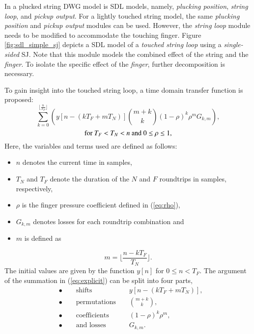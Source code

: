 \documentclass{sigchi}
\begin{document}
In \cite{karjalainen_plucked-string_1998} a plucked string DWG model is SDL models, namely, \textit{plucking position}, \textit{string loop}, and \textit{pickup output}.
For a lightly touched string model, the same \textit{plucking position} and \textit{pickup output} modules can be used.
However, the \textit{string loop} module needs to be modified to accommodate the touching finger.
Figure \ref{fig:sdl_simple_sj} depicts a SDL model of a \textit{touched string loop} using a \textit{single-sided} SJ.
Note that this module models the combined effect of the string and the \textit{finger}.
To isolate the specific effect of the \textit{finger}, further decomposition is necessary.
\begin{figure*}[h]
	\centering
	\scalebox{0.8}{}
	\caption{String loop with a scattering junction.}
	\label{fig:sdl_simple_sj}
\end{figure*}
To gain insight into the touched string loop, a time domain transfer function is proposed:
\begin{equation} \label{eq:explicit}
	\sum_{k=0}^{\lfloor \frac{n}{T_F} \rfloor}\left(y[n - (kT_F + mT_N)]\binom{m+k}{k} (1 - \rho)^{k} \rho^mG_{k,m}\right),
\end{equation}
\begin{equation*}
	\textrm{for } T_F<T_N<n \textrm{ and } 0\leq\rho\leq1\notag,
\end{equation*}
Here, the variables and terms used are defined as follows:
\begin{itemize}
	\setlength\itemsep{0.1em}
	\item $n$ denotes the current time in samples,
	\item $T_N$ and $T_F$ denote the duration of the $N$ and $F$ roundtrips in samples, respectively,
	\item $\rho$ is the finger pressure coefficient defined in (\ref{eq:rho}),
	\item $G_{k,m}$ denotes losses for each roundtrip combination and
	\item $m$ is defined as
\end{itemize}
\begin{equation}
	m = \lfloor \frac{n - kT_F}{T_N} \rfloor.
\end{equation}
The initial values are given by the function $y[n]$ for $0 \leq n < T_F$.
The argument of the summation in (\ref{eq:explicit}) can be split into four parts,
\begin{align}
	\label{eq:shifts} & \bullet\qquad\textrm{shifts }       &  & y[n - (kT_F + mT_N)],  \\[1em]
	\label{eq:perm}   & \bullet\qquad\textrm{permutations } &  & \binom{m+k}{k},        \\[1em]
	\label{eq:coef}   & \bullet\qquad\textrm{coefficients } &  & (1 - \rho)^{k} \rho^m, \\[1em]
	\label{eq:loss}   & \bullet\qquad\textrm{and losses }   &  & G_{k,m}.
\end{align}
\end{document}
